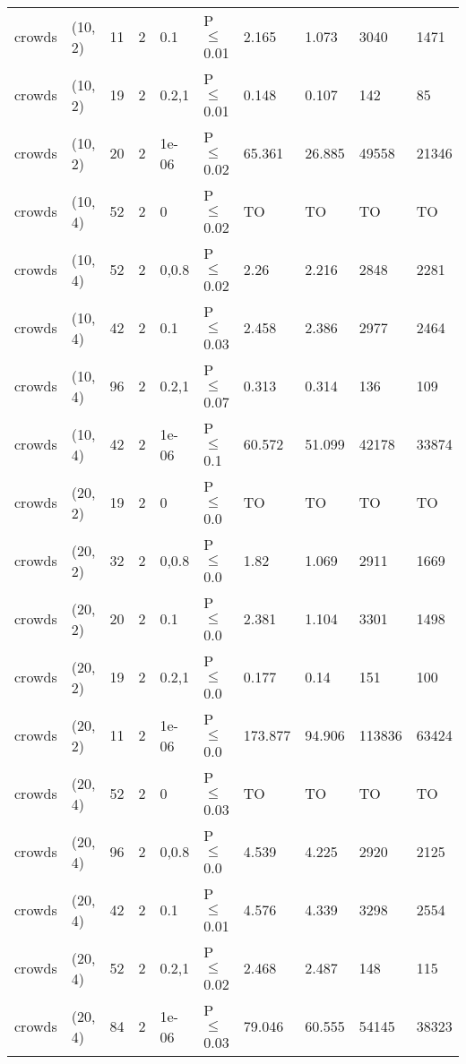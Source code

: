 \begin{longtable}{llrrllllll}
 crowds        & (10, 2)   &     	11 &   2 & 0.1   & P$\leq$0.01  & 2.165    & 1.073    & 3040    & 1471    \\
 crowds        & (10, 2)   &     	19 &   2 & 0.2,1 & P$\leq$0.01  & 0.148    & 0.107    & 142     & 85      \\
 crowds        & (10, 2)   &     	20 &   2 & 1e-06 & P$\leq$0.02  & 65.361   & 26.885   & 49558   & 21346   \\
 crowds        & (10, 4)   &     	52 &   2 & 0     & P$\leq$0.02  & TO       & TO       & TO      & TO      \\
 crowds        & (10, 4)   &     	52 &   2 & 0,0.8 & P$\leq$0.02  & 2.26     & 2.216    & 2848    & 2281    \\
 crowds        & (10, 4)   &     	42 &   2 & 0.1   & P$\leq$0.03  & 2.458    & 2.386    & 2977    & 2464    \\
 crowds        & (10, 4)   &     	96 &   2 & 0.2,1 & P$\leq$0.07  & 0.313    & 0.314    & 136     & 109     \\
 crowds        & (10, 4)   &     	42 &   2 & 1e-06 & P$\leq$0.1   & 60.572   & 51.099   & 42178   & 33874   \\
 crowds        & (20, 2)   &     	19 &   2 & 0     & P$\leq$0.0   & TO       & TO       & TO      & TO      \\
 crowds        & (20, 2)   &     	32 &   2 & 0,0.8 & P$\leq$0.0   & 1.82     & 1.069    & 2911    & 1669    \\
 crowds        & (20, 2)   &     	20 &   2 & 0.1   & P$\leq$0.0   & 2.381    & 1.104    & 3301    & 1498    \\
 crowds        & (20, 2)   &     	19 &   2 & 0.2,1 & P$\leq$0.0   & 0.177    & 0.14     & 151     & 100     \\
 crowds        & (20, 2)   &     	11 &   2 & 1e-06 & P$\leq$0.0   & 173.877  & 94.906   & 113836  & 63424   \\
 crowds        & (20, 4)   &     	52 &   2 & 0     & P$\leq$0.03  & TO       & TO       & TO      & TO      \\
 crowds        & (20, 4)   &     	96 &   2 & 0,0.8 & P$\leq$0.0   & 4.539    & 4.225    & 2920    & 2125    \\
 crowds        & (20, 4)   &     	42 &   2 & 0.1   & P$\leq$0.01  & 4.576    & 4.339    & 3298    & 2554    \\
 crowds        & (20, 4)   &     	52 &   2 & 0.2,1 & P$\leq$0.02  & 2.468    & 2.487    & 148     & 115     \\
 crowds        & (20, 4)   &     	84 &   2 & 1e-06 & P$\leq$0.03  & 79.046   & 60.555   & 54145   & 38323   \\

\end{longtable}
